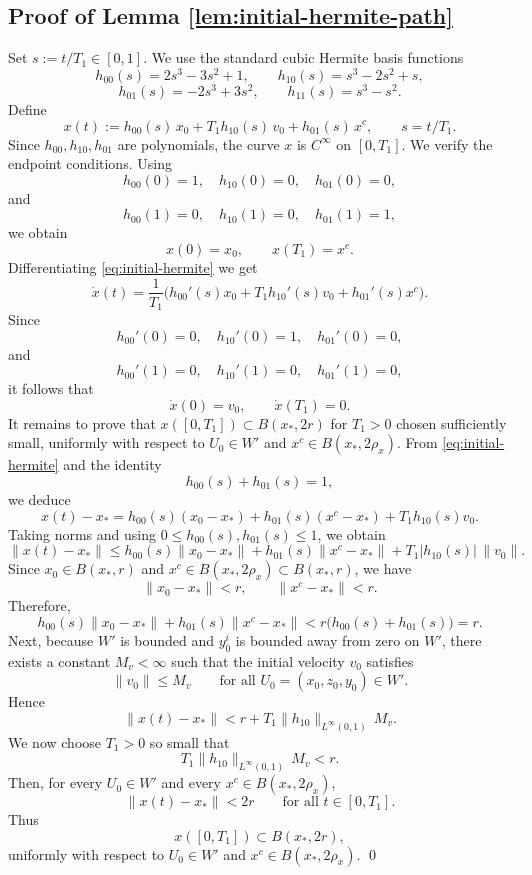\documentclass[11pt, a4paper,leqno]{amsart}
\theoremstyle{definition}
\numberwithin{equation}{section}
\begin{document}
\subsection{Proof of Lemma \ref{lem:initial-hermite-path}}\label{Pr0} Set $s:={t}/{T_1}\in[0,1]$.  We use the standard cubic Hermite basis functions
\[
h_{00}(s)=2s^3-3s^2+1,\qquad
h_{10}(s)=s^3-2s^2+s,
\]
\[
h_{01}(s)=-2s^3+3s^2,\qquad
h_{11}(s)=s^3-s^2.
\]
Define
\begin{equation}\label{eq:initial-hermite}
x(t):=
h_{00}(s)\,x_0
+
T_1 h_{10}(s)\,v_0
+
h_{01}(s)\,x^c,
\qquad s={t}/{T_1}.
\end{equation}
Since \(h_{00},h_{10},h_{01}\) are polynomials, the curve \(x\) is \(C^\infty\)
on \([0,T_1]\). We verify the endpoint conditions. Using
\[
h_{00}(0)=1,\quad h_{10}(0)=0,\quad h_{01}(0)=0,
\]
and
\[
h_{00}(1)=0,\quad h_{10}(1)=0,\quad h_{01}(1)=1,
\]
we obtain
\[
x(0)=x_0,\qquad x(T_1)=x^c.
\]
Differentiating \eqref{eq:initial-hermite}  we get
\[
\dot x(t)
=
\frac1{T_1}\Big(h_{00}'(s)x_0 + T_1 h_{10}'(s)v_0 + h_{01}'(s)x^c\Big).
\]
Since
\[
h_{00}'(0)=0,\quad h_{10}'(0)=1,\quad h_{01}'(0)=0,
\]
and
\[
h_{00}'(1)=0,\quad h_{10}'(1)=0,\quad h_{01}'(1)=0,
\]
it follows that
\[
\dot x(0)=v_0,\qquad \dot x(T_1)=0.
\]
It remains to prove that \(x([0,T_1])\subset B(x_\ast,2r)\) for \(T_1>0\) chosen
sufficiently small, uniformly with respect to \(U_0\in W'\) and
\(x^c\in B(x_\ast,2\rho_x)\). From \eqref{eq:initial-hermite} and the identity
\[
h_{00}(s)+h_{01}(s)=1,
\]
we deduce
\[
x(t)-x_\ast
=
h_{00}(s)(x_0-x_\ast)
+
h_{01}(s)(x^c-x_\ast)
+
T_1 h_{10}(s)v_0.
\]
Taking norms and using \(0\le h_{00}(s),h_{01}(s)\le 1\), we obtain
\[
\|x(t)-x_\ast\|
\le
h_{00}(s)\|x_0-x_\ast\|
+
h_{01}(s)\|x^c-x_\ast\|
+
T_1 |h_{10}(s)|\,\|v_0\|.
\]
Since \(x_0\in B(x_\ast,r)\) and
\(x^c\in B(x_\ast,2\rho_x)\subset B(x_\ast,r)\), we have
\[
\|x_0-x_\ast\|<r,\qquad \|x^c-x_\ast\|<r.
\]
Therefore,
\[
h_{00}(s)\|x_0-x_\ast\|+h_{01}(s)\|x^c-x_\ast\|
<
r\big(h_{00}(s)+h_{01}(s)\big)
=
r.
\]
Next, because \(W'\) is bounded and \(y_0^i\) is bounded away from zero on \(W'\),
there exists a constant \(M_v<\infty\) such that the initial velocity $v_0$ satisfies
\[
\|v_0\|\le M_v
\qquad
\text{for all }U_0=(x_0,z_0,y_0)\in W'.
\]
Hence
\[
\|x(t)-x_\ast\|
<
r + T_1\|h_{10}\|_{L^\infty(0,1)}\,M_v.
\]
We now choose \(T_1>0\) so small that
\[
T_1\|h_{10}\|_{L^\infty(0,1)}\,M_v<r.
\]
Then, for every \(U_0\in W'\) and every \(x^c\in B(x_\ast,2\rho_x)\),
\[
\|x(t)-x_\ast\|<2r
\qquad \text{for all } t\in[0,T_1].
\]
Thus
\[
x([0,T_1])\subset B(x_\ast,2r),
\]
uniformly with respect to \(U_0\in W'\) and \(x^c\in B(x_\ast,2\rho_x)\). \qed
\end{document}
